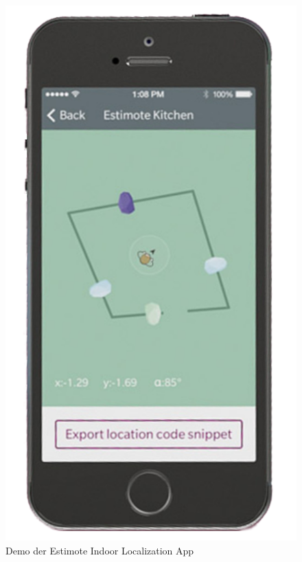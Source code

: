 \begin{figure}[H]
\centering
\includegraphics[scale=0.3]{Bilder/TrackEstimote}
\caption{Demo der Estimote Indoor Localization App \cite{TrEs}}
\end{figure}